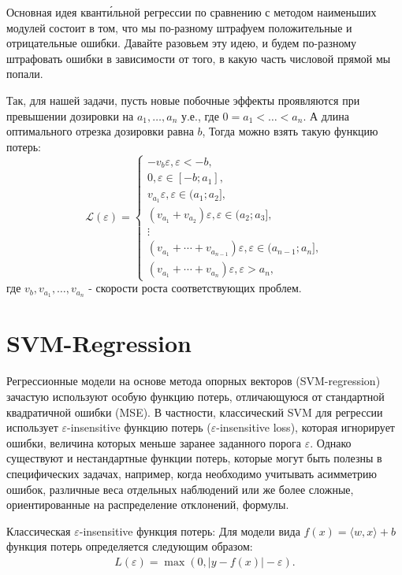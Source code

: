 \begin{solution}
    Основная идея квант\'{и}льной регрессии по сравнению с методом наименьших модулей состоит в том, что мы по-разному штрафуем положительные и отрицательные ошибки. Давайте разовьем эту идею, и будем по-разному штрафовать ошибки в зависимости от того, в какую часть числовой прямой мы попали.

    Так, для нашей задачи, пусть новые побочные эффекты проявляются при превышении дозировки на $a_1, \dotsc, a_n$ у.е., где $0= a_1 < \ldots < a_n$. А длина оптимального отрезка дозировки равна $b$, Тогда можно взять такую функцию потерь:
    $$\mathscr{L}(\varepsilon) = \begin{cases}
        -v_b\varepsilon, \varepsilon < -b,\\
        0, \varepsilon \in [-b; a_1],\\
        v_{a_1}\varepsilon, \varepsilon \in (a_1; a_2],\\
        (v_{a_1} + v_{a_2})\varepsilon, \varepsilon \in (a_2; a_3],\\
        \vdots\\
        (v_{a_1} + \dotsb + v_{a_{n - 1}})\varepsilon, \varepsilon \in (a_{n-1}; a_n],\\
        (v_{a_1} + \dotsb + v_{a_n})\varepsilon, \varepsilon > a_n,
    \end{cases}$$
    где $v_b, v_{a_1}, \dotsc, v_{a_n}$ - скорости роста соответствующих проблем.
\end{solution}

\newpage
\section*{SVM-Regression}

Регрессионные модели на основе метода опорных векторов (SVM-regression) зачастую используют особую функцию потерь, отличающуюся от стандартной квадратичной ошибки (MSE). В частности, классический SVM для регрессии использует \(\varepsilon\)-insensitive функцию потерь (\(\varepsilon\)-insensitive loss), которая игнорирует ошибки, величина которых меньше заранее заданного порога \(\varepsilon\). Однако существуют и нестандартные функции потерь, которые могут быть полезны в специфических задачах, например, когда необходимо учитывать асимметрию ошибок, различные веса отдельных наблюдений или же более сложные, ориентированные на распределение отклонений, формулы.

Классическая \(\varepsilon\)-insensitive функция потерь:
Для модели вида \(f(x) = \langle w, x \rangle + b\) функция потерь определяется следующим образом:
\begin{align*}
L(\varepsilon) = \max(0, | y - f(x) | - \varepsilon).
\end{align*}

